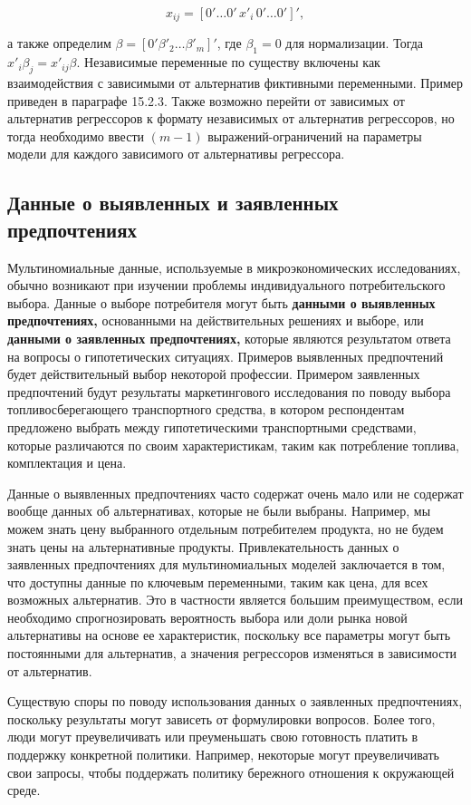\[x_{ij}={\left[0'\dots 0' \, x'_i \, 0'\dots 0'\right]}',\] 

а также определим $\beta ={\left[0'{\beta }'_2\dots {\beta }'_m\right]}'$, где ${\beta }_1=0$ для нормализации. Тогда $x'_i{\beta }_j=x'_{ij}\beta .$ Независимые переменные по существу включены как взаимодействия с зависимыми от альтернатив фиктивными переменными. Пример приведен в параграфе 15.2.3. Также возможно перейти от зависимых от альтернатив регрессоров к формату независимых от альтернатив регрессоров, но тогда необходимо ввести $(m-1)$ выражений-ограничений на параметры модели для каждого зависимого от альтернативы регрессора.

\subsection{Данные о выявленных и заявленных предпочтениях}

Мультиномиальные данные, используемые в микроэкономических исследованиях, обычно возникают при изучении проблемы индивидуального потребительского выбора. Данные о выборе потребителя могут быть \textbf{данными о выявленных предпочтениях, } основанными на действительных решениях и выборе, или \textbf{данными о заявленных предпочтениях, }которые являются результатом ответа на вопросы о гипотетических ситуациях. Примеров выявленных предпочтений будет действительный выбор некоторой профессии. Примером заявленных предпочтений будут результаты маркетингового исследования по поводу выбора топливосберегающего транспортного средства, в котором респондентам предложено выбрать между гипотетическими транспортными средствами, которые различаются по своим характеристикам, таким как потребление топлива, комплектация и цена.

Данные о выявленных предпочтениях часто содержат очень мало или не содержат вообще данных об альтернативах, которые не были выбраны. Например, мы можем знать цену выбранного отдельным потребителем продукта, но не будем знать цены на альтернативные продукты. Привлекательность данных о заявленных предпочтениях для мультиномиальных моделей заключается в том, что доступны данные по ключевым переменными, таким как цена, для всех возможных альтернатив. Это в частности является большим преимуществом, если необходимо спрогнозировать вероятность выбора или доли рынка новой альтернативы на основе ее характеристик, поскольку все параметры могут быть постоянными для альтернатив, а значения регрессоров изменяться в зависимости от альтернатив.

Существую споры по поводу использования данных о заявленных предпочтениях, поскольку результаты могут зависеть от формулировки вопросов. Более того, люди могут преувеличивать или преуменьшать свою готовность платить в поддержку конкретной политики. Например, некоторые могут преувеличивать свои запросы, чтобы поддержать политику бережного отношения к окружающей среде. 

